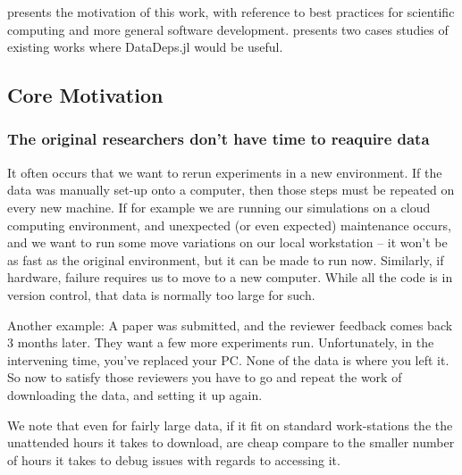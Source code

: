 \documentclass{jors}
\begin{document}
 presents the motivation of this work, with reference to best practices for scientific computing and more general software development.
 presents two cases studies of existing works where DataDeps.jl would be useful.

\subsection{Core Motivation} \label{sec:motivation}

\subsubsection{The original researchers don't have time to reaquire data}
It often occurs that we want to rerun experiments in a new environment.
If the data was manually set-up onto a computer, then those steps must be repeated on every new machine.
If for example we are running our simulations on a cloud computing environment,
and unexpected (or even expected) maintenance occurs, and we want to run some move variations on our local workstation -- it won't be as fast as the original environment, but it can be made to run now.
Similarly, if hardware, failure requires us to move to a new computer.
While all the code is in version control, that data is normally too large for such.

Another example:
A paper was submitted, and the reviewer feedback comes back 3 months later.
They want a few more experiments run.
Unfortunately, in the intervening time, you've replaced your PC.
None of the data is where you left it.
So now to satisfy those reviewers you have to go and repeat the work of downloading the data,
and setting it up again.


We note that even for fairly large data, if it fit on standard work-stations the the unattended hours it takes to download,
are cheap compare to the smaller number of hours it takes to debug issues with regards to accessing it.
\end{document}
